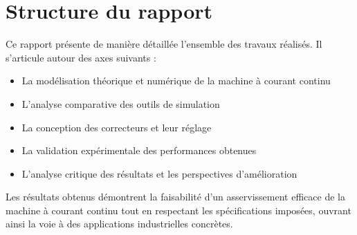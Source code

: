 \section{Structure du rapport}

Ce rapport présente de manière détaillée l'ensemble des travaux réalisés. Il s'articule autour des axes suivants :
\begin{itemize}
    \item La modélisation théorique et numérique de la machine à courant continu
    \item L'analyse comparative des outils de simulation
    \item La conception des correcteurs et leur réglage
    \item La validation expérimentale des performances obtenues
    \item L'analyse critique des résultats et les perspectives d'amélioration
\end{itemize}

Les résultats obtenus démontrent la faisabilité d'un asservissement efficace de la machine à courant continu tout en respectant les spécifications imposées, ouvrant ainsi la voie à des applications industrielles concrètes.
